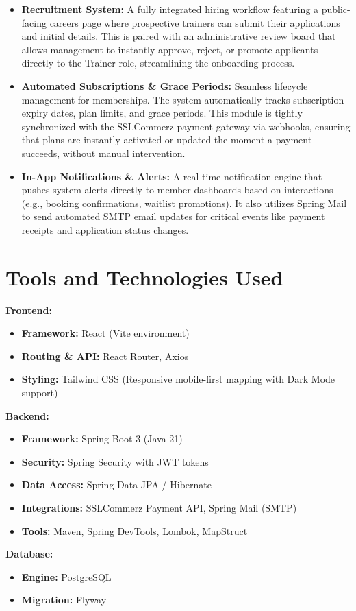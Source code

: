 \documentclass[12pt,a4paper]{article}
\begin{document}
\begin{itemize}[leftmargin=*]
    \item \textbf{Recruitment System:} A fully integrated hiring workflow featuring a public-facing careers page where prospective trainers can submit their applications and initial details. This is paired with an administrative review board that allows management to instantly approve, reject, or promote applicants directly to the Trainer role, streamlining the onboarding process.
    \item \textbf{Automated Subscriptions \& Grace Periods:} Seamless lifecycle management for memberships. The system automatically tracks subscription expiry dates, plan limits, and grace periods. This module is tightly synchronized with the SSLCommerz payment gateway via webhooks, ensuring that plans are instantly activated or updated the moment a payment succeeds, without manual intervention.
    \item \textbf{In-App Notifications \& Alerts:} A real-time notification engine that pushes system alerts directly to member dashboards based on interactions (e.g., booking confirmations, waitlist promotions). It also utilizes Spring Mail to send automated SMTP email updates for critical events like payment receipts and application status changes.
\end{itemize}

\newpage
\section{Tools and Technologies Used}
\textbf{Frontend:}
\begin{itemize}
    \item \textbf{Framework:} React (Vite environment)
    \item \textbf{Routing \& API:} React Router, Axios
    \item \textbf{Styling:} Tailwind CSS (Responsive mobile-first mapping with Dark Mode support)
\end{itemize}
\textbf{Backend:}
\begin{itemize}
    \item \textbf{Framework:} Spring Boot 3 (Java 21)
    \item \textbf{Security:} Spring Security with JWT tokens
    \item \textbf{Data Access:} Spring Data JPA / Hibernate
    \item \textbf{Integrations:} SSLCommerz Payment API, Spring Mail (SMTP)
    \item \textbf{Tools:} Maven, Spring DevTools, Lombok, MapStruct
\end{itemize}
\textbf{Database:}
\begin{itemize}
    \item \textbf{Engine:} PostgreSQL
    \item \textbf{Migration:} Flyway
\end{itemize}
\end{document}
